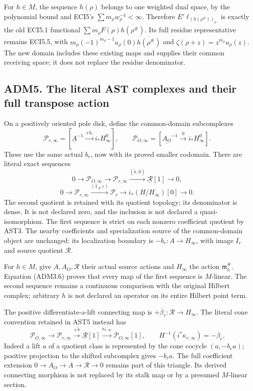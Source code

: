 For \(h\in M\), the sequence \(h(\rho)\) belongs to one weighted dual
space, by the polynomial bound and ECI5's
\(\sum m_\rho w_\rho^{-4}<\infty\). Therefore
\(E'\ell_{(h(\rho^\#))_\rho}\) is exactly the old ECI5.1 functional
\(\sum m_\rho F(\rho)\overline{h(\rho^\#)}\). Its full residue
representative remains ECI5.5, with
\(m_\rho(-1)^{m_\rho-1}u_\rho(0)\overline{h(\rho^\#)}\) and
\(\zeta(\rho+z)=z^{m_\rho}u_\rho(z)\). The new domain includes these
existing maps and supplies their common receiving space; it does not
replace the residue denominator.

\subsection{ADM5. The literal AST complexes and their full transpose
action}\label{adm5.-the-literal-ast-complexes-and-their-full-transpose-action}

On a positively oriented pole disk, define the common-domain
subcomplexes \[
\mathscr P_{r,\infty}=
[\underline A^{-1}\xrightarrow{+b_r}i_*H_\infty^0],\qquad
\mathscr P_{O,\infty}=
[\underline{A_O}^{-1}\xrightarrow0 i_*H_\infty^0].
\tag{ADM5.1}
\] These use the same actual \(b_r\), now with its proved smaller
codomain. There are literal exact sequences \[
0\to\mathscr P_{O,\infty}\to\mathscr P_{r,\infty}
\xrightarrow{(\widetilde\pi,0)}\underline{\mathcal R}[1]\to0,
\] \[
0\to\mathscr P_{r,\infty}\xrightarrow{(1_A,\iota)}
\mathscr P_r\to i_*(H/H_\infty)[0]\to0 .
\tag{ADM5.2}
\] The second quotient is retained with its quotient topology; its
denominator is dense. It is not declared zero, and the inclusion is not
declared a quasi-isomorphism. The first sequence is strict on each
nonzero coefficient quotient by AST3. The nearby coefficients and
specialization source of the common-domain object are unchanged: its
localization boundary is \(-b_r:A\to H_\infty\), with image \(I_r\) and
source quotient \(\mathcal R\).

For \(h\in M\), give \(A,A_O,\mathcal R\) their actual source actions
and \(H_\infty\) the action \(\mathfrak m_h^\#\). Equation (ADM3.6)
proves that every map of the first sequence is \(M\)-linear. The second
sequence remains a continuous comparison with the original Hilbert
complex; arbitrary \(h\) is not declared an operator on its entire
Hilbert point term.

The positive differentiate-a-lift connecting map is
\(+\overline\beta_r:\mathcal R\to H_\infty\). The literal cone
convention retained in AST5 instead has \[
\mathscr P_{O,\infty}\to\mathscr P_{r,\infty}
\xrightarrow{+\widetilde\pi}\underline{\mathcal R}[1]
\xrightarrow{\kappa_{r,\infty}}\mathscr P_{O,\infty}[1],
\qquad H^{-1}(i^*\kappa_{r,\infty})=-\overline\beta_r.
\tag{ADM5.3}
\] Indeed a lift \(a\) of a quotient class is represented by the cone
cocycle \((a,-b_ra)\); positive projection to the shifted subcomplex
gives \(-b_ra\). The full coefficient extension
\(0\to A_O\to A\to\mathcal R\to0\) remains part of this triangle. Its
derived connecting morphism is not replaced by its stalk map or by a
presumed \(M\)-linear section.

